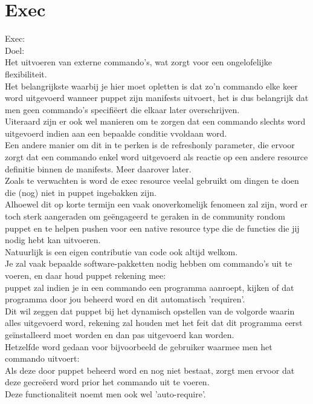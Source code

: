 \section{Exec}
Exec:\\
Doel:\\
	Het uitvoeren van externe commando's, wat zorgt voor een ongelofelijke flexibiliteit.\\
	Het belangrijkste waarbij je hier moet opletten is dat zo'n commando elke keer word uitgevoerd wanneer puppet zijn manifests uitvoert, het is dus belangrijk dat men geen commando's specifi\"{e}ert die elkaar later overschrijven.\\
	Uiteraard zijn er ook wel manieren om te zorgen dat een commando slechts word uitgevoerd indien aan een bepaalde conditie vvoldaan word.\\
	Een andere manier om dit in te perken is de refreshonly parameter, die ervoor zorgt dat een commando enkel word uitgevoerd als reactie op een andere resource definitie binnen de manifests. Meer daarover later.\\

	Zoals te verwachten is word de exec resource veelal gebruikt om dingen te doen die (nog) niet in puppet ingebakken zijn.\\
	Alhoewel dit op korte termijn een vaak onoverkomelijk fenomeen zal zijn, word er toch sterk aangeraden om ge\"{e}ngageerd te geraken in de community rondom puppet en te helpen pushen voor een native resource type die de functies die jij nodig hebt kan uitvoeren.\\
	Natuurlijk is een eigen contributie van code ook altijd welkom.\\

	Je zal vaak bepaalde software-pakketten nodig hebben om commando's uit te voeren, en daar houd puppet rekening mee:\\
	puppet zal indien je in een commando een programma aanroept, kijken of dat programma door jou beheerd word en dit automatisch 'requiren'.\\
	Dit wil zeggen dat puppet bij het dynamisch opstellen van de volgorde waarin alles uitgevoerd word, rekening zal houden met het feit dat dit programma eerst geïnstalleerd moet worden en dan pas uitgevoerd kan worden.\\
	Hetzelfde word gedaan voor bijvoorbeeld de gebruiker waarmee men het commando uitvoert:\\
	Als deze door puppet beheerd word en nog niet bestaat, zorgt men ervoor dat deze gecre\"{e}erd word prior het commando uit te voeren.\\
	Deze functionaliteit noemt men ook wel 'auto-require'.\\

